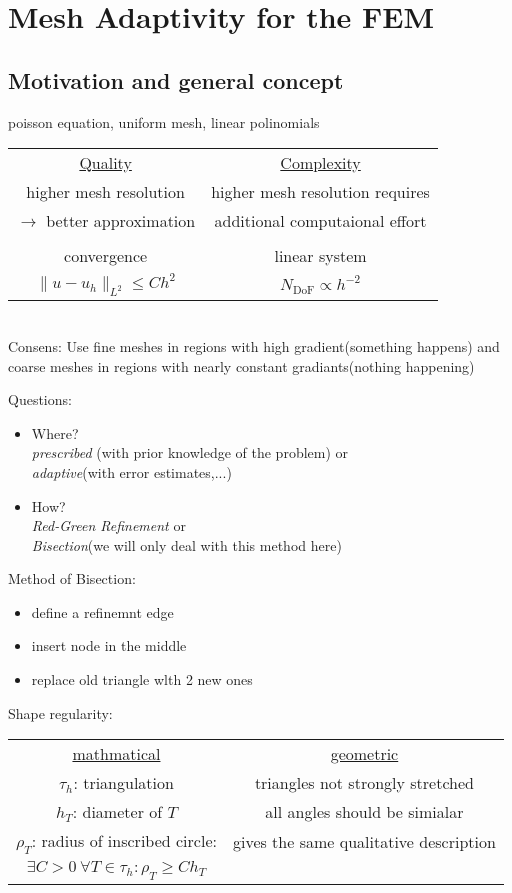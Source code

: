 \section{Mesh Adaptivity for the FEM}
\subsection{Motivation and general concept}

\begin{example}
	poisson equation, uniform mesh, linear polinomials
\end{example}

\begin{tabular}{c | c}
	\underline{Quality} & \underline{Complexity}\\
	higher mesh resolution & higher mesh resolution requires \\
	 $\to$ better approximation & additional computaional effort\\
	 & \\
	 convergence & linear system \\
	 $\|u-u_h\|_{L^2} \leq C h^2$ & $N_{\text{DoF}}\propto h^{-2}$
\end{tabular}\\
Consens: Use fine meshes in regions with high gradient(something happens) and coarse meshes in regions with nearly constant gradiants(nothing happening)\nl

Questions:
\begin{itemize}
	\item Where?\\
		\textit{prescribed} (with prior knowledge of the problem) or \\
		\textit{adaptive}(with error estimates,...)
	\item How?\\
		\textit{Red-Green Refinement} or \\
		\textit{Bisection}(we will only deal with this method here)
\end{itemize}

Method of Bisection:
\begin{itemize}
	\item define a refinemnt edge
	\item insert node in the middle
	\item replace old triangle wlth 2 new ones 
\end{itemize}


Shape regularity:\\
\begin{tabular}{c | c}
	\underline{mathmatical} & \underline{geometric}\\
	$\tau_h$:  triangulation & triangles not strongly stretched \\
	$h_T$:  diameter of $T$ & all angles should be \glqq simialar \grqq \\
	$\rho_T$:  radius of inscribed circle:	& gives the same qualitative description\\
	$\exists C > 0\ \forall T \in \tau_h \colon \rho_T \geq C h_T$ & 
\end{tabular}


